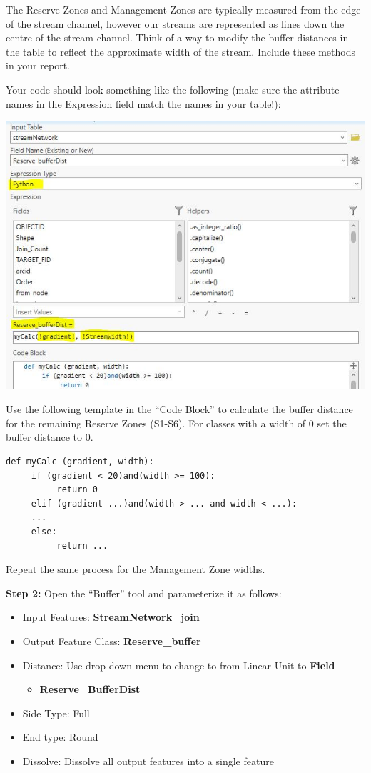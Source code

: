 \documentclass[
]{book}
\providecommand{\tightlist}{%
  \setlength{\itemsep}{0pt}\setlength{\parskip}{0pt}}
\begin{document}
The Reserve Zones and Management Zones are typically measured from the edge of the stream channel, however our streams are represented as lines down the centre of the stream channel. Think of a way to modify the buffer distances in the table to reflect the approximate width of the stream. Include these methods in your report.

Your code should look something like the following (make sure the attribute names in the Expression field match the names in your table!):

\includegraphics[width=0.75\linewidth]{images/03-stream-network-python}

Use the following template in the ``Code Block'' to calculate the buffer distance for the remaining Reserve Zones (S1-S6). For classes with a width of 0 set the buffer distance to 0.

\begin{verbatim}
def myCalc (gradient, width):
     if (gradient < 20)and(width >= 100):
          return 0
     elif (gradient ...)and(width > ... and width < ...):
     ...
     else:
          return ...
\end{verbatim}

Repeat the same process for the Management Zone widths.

\textbf{Step 2:} Open the ``Buffer'' tool and parameterize it as follows:

\begin{itemize}
\tightlist
\item
  Input Features: \textbf{StreamNetwork\_join}
\item
  Output Feature Class: \textbf{Reserve\_buffer}
\item
  Distance: Use drop-down menu to change to from Linear Unit to \textbf{Field}

  \begin{itemize}
  \tightlist
  \item
    \textbf{Reserve\_BufferDist}
  \end{itemize}
\item
  Side Type: Full
\item
  End type: Round
\item
  Dissolve: Dissolve all output features into a single feature
\end{itemize}
\end{document}
